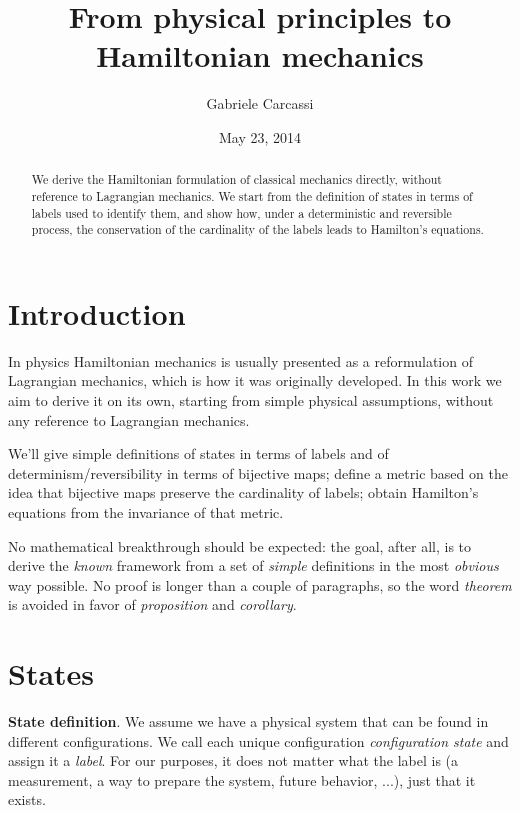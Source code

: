 \documentclass[aps,twocolumn,floatfix,nofootinbib]{revtex4}   %
\theoremstyle{definition}
\begin{document}
\title{From physical principles to Hamiltonian mechanics}
\author{Gabriele Carcassi}
\date{May 23, 2014}

\begin{abstract}
We derive the Hamiltonian formulation of classical mechanics directly, without reference to Lagrangian mechanics.
We start from the definition of states in terms of labels used to identify them, and show how, under a deterministic and
reversible process, the conservation of the cardinality of the labels leads to Hamilton's equations.\end{abstract}

\maketitle

\section{Introduction}
In physics Hamiltonian mechanics is usually presented as a reformulation of Lagrangian mechanics, which is how it was originally developed. In this work we aim to derive it on its own, starting from simple physical assumptions, without any reference to Lagrangian mechanics.

We'll give simple definitions of states in terms of labels and of determinism/reversibility in terms of bijective maps; define a metric based on the idea that bijective maps preserve the cardinality of labels; obtain Hamilton's equations from the invariance of that metric.

No mathematical breakthrough should be expected: the goal, after all, is to derive the \emph{known} framework from a set of \emph{simple} definitions in the most \emph{obvious} way possible. No proof is longer than a couple of paragraphs, so the word \emph{theorem} is avoided in favor of \emph{proposition} and \emph{corollary}.

\section{States}
\textbf{State definition}. We assume we have a physical system that can be found in different configurations. We call each unique configuration \emph{configuration state} and assign it a \emph{label}. For our purposes, it does not matter what the label is (a measurement, a way to prepare the system, future behavior, ...), just that it exists.
\end{document}
